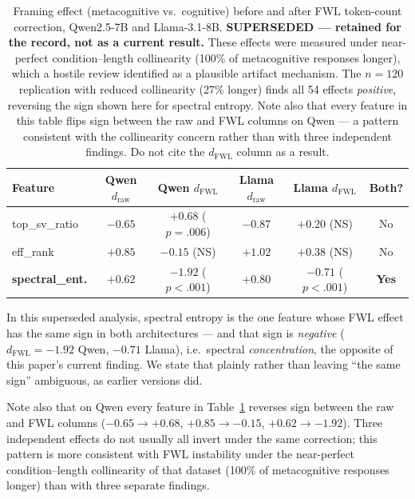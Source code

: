 \documentclass[11pt,a4paper]{article}
\begin{document}
\begin{table}[H]
\centering
\caption{Framing effect (metacognitive vs.\ cognitive) before and after FWL
token-count correction, Qwen2.5-7B and Llama-3.1-8B.
\textbf{SUPERSEDED --- retained for the record, not as a current result.}
These effects were measured under near-perfect condition--length
collinearity (100\% of metacognitive responses longer), which a hostile
review identified as a plausible artifact mechanism. The $n{=}120$
replication with reduced collinearity (27\% longer) finds all 54 effects
\emph{positive}, reversing the sign shown here for spectral entropy. Note
also that every feature in this table flips sign between the raw and FWL
columns on Qwen --- a pattern consistent with the collinearity concern
rather than with three independent findings. Do not cite the
$d_{\text{FWL}}$ column as a result.}
\label{tab:study2_fwl}
\begin{tabular}{lccccc}
\toprule
\textbf{Feature} & \textbf{Qwen $d_{\text{raw}}$} & \textbf{Qwen $d_{\text{FWL}}$} & \textbf{Llama $d_{\text{raw}}$} & \textbf{Llama $d_{\text{FWL}}$} & \textbf{Both?} \\
\midrule
top\_sv\_ratio     & $-0.65$ & $+0.68$ ($p = .006$)  & $-0.87$ & $+0.20$ (NS)  & No  \\
eff\_rank          & $+0.85$ & $-0.15$ (NS)           & $+1.02$ & $+0.38$ (NS)  & No  \\
\textbf{spectral\_ent.} & $+0.62$ & $\mathbf{-1.92}$ ($p < .001$) & $+0.80$ & $\mathbf{-0.71}$ ($p < .001$) & \textbf{Yes} \\
\bottomrule
\end{tabular}
\end{table}

In this superseded analysis, spectral entropy is the one feature whose FWL
effect has the same sign in both architectures --- and that sign is
\emph{negative} ($d_{\text{FWL}} = -1.92$ Qwen, $-0.71$ Llama), i.e.\
spectral \emph{concentration}, the opposite of this paper's current
finding. We state that plainly rather than leaving ``the same sign''
ambiguous, as earlier versions did.

Note also that on Qwen every feature in Table~\ref{tab:study2_fwl}
reverses sign between the raw and FWL columns
($-0.65 \to +0.68$, $+0.85 \to -0.15$, $+0.62 \to -1.92$). Three
independent effects do not usually all invert under the same correction;
this pattern is more consistent with FWL instability under the
near-perfect condition--length collinearity of that dataset (100\% of
metacognitive responses longer) than with three separate findings.
\end{document}
